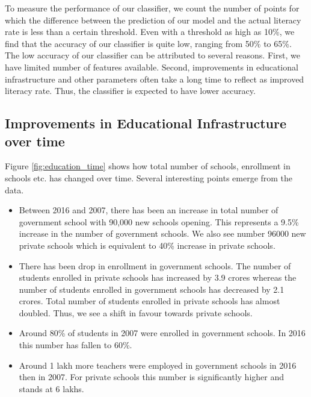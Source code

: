 \documentclass[twoside]{article}
\begin{document}
To measure the performance of our classifier, we count the number of points for which the difference between the prediction of our model and the actual literacy rate is less than a certain threshold. Even with a threshold as high as 10\%, we find that the accuracy of our classifier is quite low, ranging from 50\% to 65\%. The low accuracy of our classifier can be attributed to several reasons. First, we have limited number of features available. Second, improvements in educational infrastructure and other parameters often take a long time to reflect as improved literacy rate. Thus, the classifier is expected to have lower accuracy.

\subsection*{Improvements in Educational Infrastructure over time}
Figure \ref{fig:education_time} shows how total number of schools, enrollment in schools etc. has changed over time. Several interesting points emerge from the data.
\begin{itemize}
    \item Between 2016 and 2007, there has been an increase in total number of government school with 90,000 new schools opening. This represents a 9.5\% increase in the number of government schools. We also see number 96000 new private schools which is equivalent to 40\% increase in private schools.
    \item There has been drop in enrollment in government schools. The number of students enrolled in private schools has increased by 3.9 crores whereas the number of students enrolled in government schools has decreased by 2.1 crores. Total number of students enrolled in private schools has almost doubled. Thus, we see a shift in favour towards private schools.
    \item Around 80\% of students in 2007 were enrolled in government schools. In 2016 this number has fallen to 60\%.
    \item Around 1 lakh more teachers were employed in government schools in 2016 then in 2007. For private schools this number is significantly higher and stands at 6 lakhs.
\end{itemize}
\end{document}
